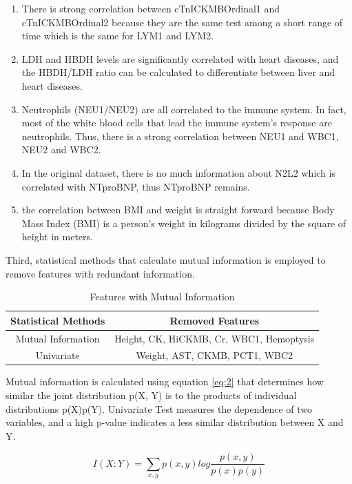 \begin{enumerate}  
\item There is strong correlation between cTnICKMBOrdinal1 and cTnICKMBOrdinal2 because they are the same test among a short range of time which is the same for LYM1 and LYM2.
\item LDH and HBDH levels are significantly correlated with heart diseases, and the HBDH/LDH ratio can be calculated to differentiate between liver and heart diseases.
\item Neutrophils (NEU1/NEU2) are all correlated to the immune system. In fact, most of the white blood cells that lead the immune system’s response are neutrophils. Thus, there is a strong correlation between NEU1 and WBC1, NEU2 and WBC2.
\item In the original dataset, there is no much information about N2L2 which is correlated with NTproBNP, thus NTproBNP remains.
\item the correlation between BMI and weight is straight forward because Body Mass Index (BMI) is a person’s weight in kilograms divided by the square of height in meters.
\end{enumerate}

Third, statistical methods that calculate mutual information is employed to remove features with redundant information.

\begin{table}[H]
\centering
\begin{tabular}{@{}cc@{}}
\toprule
Statistical Methods & Removed Features \\ \midrule
Mutual Information & Height, CK, HiCKMB, Cr, WBC1, Hemoptysis      \\
Univariate & Weight, AST, CKMB, PCT1, WBC2        \\  \bottomrule
\end{tabular}
\caption{Features with Mutual Information}
\end{table}

Mutual information is calculated using equation \ref{eq:2} that determines how similar the joint distribution p(X, Y) is to the products of individual distributions p(X)p(Y). Univariate Test measures the dependence of two variables, and a high p-value indicates a less similar distribution between X and Y. 

\begin{equation}
    I(X;Y)=\sum_{x,y}p(x, y)log\frac{p(x,y)}{p(x)p(y)} \label{eq:2}
\end{equation}

